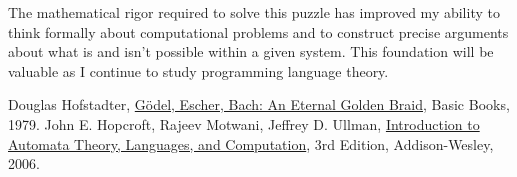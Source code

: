 \documentclass{article}
\theoremstyle{plain}
\theoremstyle{definition}
\theoremstyle{remark}
\begin{document}
The mathematical rigor required to solve this puzzle has improved my ability to think formally about computational problems and to construct precise arguments about what is and isn't possible within a given system. This foundation will be valuable as I continue to study programming language theory.

\begin{thebibliography}{99}
 Douglas Hofstadter, \href{https://en.wikipedia.org/wiki/G%C3%B6del,_Escher,_Bach}{Gödel, Escher, Bach: An Eternal Golden Braid}, Basic Books, 1979.
 John E. Hopcroft, Rajeev Motwani, Jeffrey D. Ullman, \href{https://en.wikipedia.org/wiki/Introduction_to_Automata_Theory,_Languages,_and_Computation}{Introduction to Automata Theory, Languages, and Computation}, 3rd Edition, Addison-Wesley, 2006.
\end{thebibliography}
\end{document}
